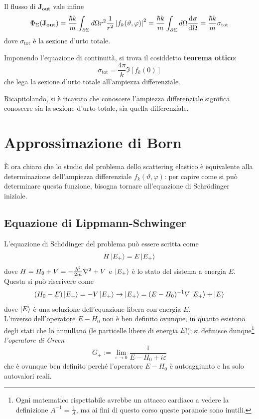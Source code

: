 Il flusso di $\mathbf{J_\textbf{out}}$ vale infine
$$\Phi_\Sigma(\mathbf{J_\textbf{out}})=\frac{\hbar k}{m}\int_{\partial\Sigma}^{}d\Omega r^2
\frac{1}{r^2} \left|f_k(\vartheta,\varphi)\right|^2 =
\frac{\hbar k}{m}\int_{\partial\Sigma}^{}d\Omega \dv[]{\sigma}{\Omega} = \frac{\hbar k}{m}
\sigma_\text{tot}$$
dove $\sigma_\text{tot}$ è la sezione d'urto totale.

Imponendo l'equazione di continuità, si trova il cosiddetto \textbf{teorema ottico}:
$$\boxed{
\sigma_\text{tot} = \frac{4\pi}{k} \Im[f_k(0)]
}$$
che lega la sezione d'urto totale all'ampiezza differenziale.

Ricapitolando, si è ricavato che conoscere l'ampiezza differenziale significa conoscere sia la sezione
d'urto totale, sia quella differenziale.
\section{Approssimazione di Born}
È ora chiaro che lo studio del problema dello scattering elastico è equivalente alla determinazione
dell'ampiezza differenziale $f_k(\vartheta,\varphi)$: per capire come si può determinare questa
funzione, bisogna tornare all'equazione di Schrödinger iniziale.
\subsection{Equazione di Lippmann-Schwinger}
L'equazione di Schödinger del problema può essere scritta come
$$H\ket{E_+}=E\ket{E_+}$$
dove $H = H_0 + V = -\frac{\hbar^2}{2m}\laplacian + V$ e $\ket{E_+}$ è lo stato del sistema a energia
$E$. Questa si può riscrivere come
$$(H_0-E)\ket{E_+}=-V\ket{E_+} \rightarrow \ket{E_+} = (E-H_0)^{-1}V\ket{E_+} + \ket{E}$$
dove $\ket{E}$ è una soluzione dell'equazione libera con energia $E$.\\
L'inverso dell'operatore $E-H_0$ non è ben definito ovunque, in quanto esistono degli stati che
lo annullano (le particelle libere di energia $E$!); si definisce dunque\footnote{
    Ogni matematico rispettabile avrebbe un attacco cardiaco a vedere la definizione
    $A^{-1}=\frac{1}{A}$, ma ai fini di questo corso queste paranoie sono inutili.
}
\textit{l'operatore di Green}
$$G_+:=\lim\limits_{\varepsilon\to0}\frac{1}{E-H_0+i\varepsilon}$$
che è ovunque ben definito perché l'operatore $E-H_0$ è autoaggiunto e ha solo autovalori reali.

